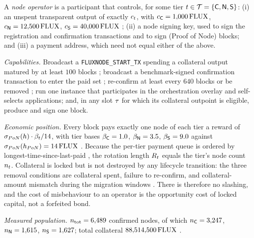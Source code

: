 \begin{definition}
\label{def:operator}
\shipped A \emph{node operator} is a participant that controls, for some tier
$t \in \mathcal{T} = \{\mathsf{C},\mathsf{N},\mathsf{S}\}$: (i) an unspent transparent output of exactly $c_{t}$, with
$c_{\mathsf{C}} = 1{,}000\,\mathrm{FLUX}$, $c_{\mathsf{N}} = 12{,}500\,\mathrm{FLUX}$, $c_{\mathsf{S}} = 40{,}000\,\mathrm{FLUX}$
; (ii) a node signing key, used to sign the
registration and confirmation transactions and to sign \PoN{} (Proof of Node) blocks; and (iii) a payment address,
which need not equal either of the above.

\emph{Capabilities.} Broadcast a \texttt{FLUXNODE\_START\_TX} spending a collateral output matured
by at least $100$ blocks ; broadcast a benchmark-signed
confirmation transaction to enter the paid set ;
re-confirm at least every $640$ blocks or be removed ;
run one \FluxOS{} instance that participates in the orchestration overlay and self-selects
applications; and, in any slot $\tau$ for which its collateral outpoint is eligible, produce and
sign one block.

\emph{Economic position.} Every block pays exactly one node of each tier a reward of
$\sigma_{PoN}(h)\cdot\beta_{t}/14$, with tier bases $\beta_{\mathsf{C}} = 1.0$, $\beta_{\mathsf{N}} = 3.5$,
$\beta_{\mathsf{S}} = 9.0$ against $\sigma_{PoN}(h_{PoN}) = 14\,\mathrm{FLUX}$
. Because the per-tier payment queue is ordered by
longest-time-since-last-paid , the rotation length
$R_{t}$ equals the tier's node count $n_{t}$. Collateral is locked but is not destroyed by any
lifecycle transition: the three removal conditions are collateral spent, failure to re-confirm, and
collateral-amount mismatch during the migration windows
. There is therefore no slashing, and the cost of
misbehaviour to an operator is the opportunity cost of locked capital, not a forfeited bond.

\emph{Measured population.} $n_{\mathrm{tot}} = 6{,}489$ confirmed nodes, of which
$n_{\mathsf{C}} = 3{,}247$, $n_{\mathsf{N}} = 1{,}615$, $n_{\mathsf{S}} = 1{,}627$; total collateral
$88{,}514{,}500\,\mathrm{FLUX}$ .
\end{definition}

